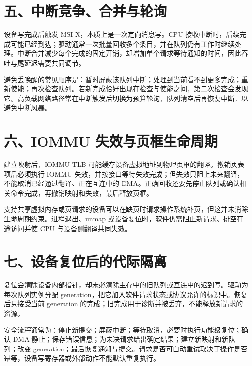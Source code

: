 \section{五、中断竞争、合并与轮询}

设备写完成后触发 MSI-X，本质上是一次定向消息写。CPU 接收中断时，后续完成可能已经到达；驱动通常一次批量回收多个条目，并在队列仍有工作时继续处理。中断合并减少每个完成的固定开销，却增加单个请求等待通知的时间，因此吞吐与尾延迟需要共同调节。

避免丢唤醒的常见顺序是：暂时屏蔽该队列中断；处理到当前看不到更多完成；重新使能；再次检查队列。若新完成恰好出现在检查与使能之间，第二次检查会发现它。高负载网络路径常在中断触发后切换为预算轮询，队列清空后再恢复中断，以避免中断风暴。

\section{六、IOMMU 失效与页框生命周期}

建立映射后，IOMMU TLB 可能缓存设备虚拟地址到物理页框的翻译。撤销页表项后必须执行 IOMMU 失效，并按接口等待失效完成；但失效只阻止未来翻译，不能取消已经通过翻译、正在互连中的 DMA。正确回收还要先停止队列或确认相关命令完成，再撤销映射和失效，最后释放页框。

支持共享虚拟内存或页请求的设备可以在缺页时请求操作系统补页，但这并未消除生命周期约束。进程退出、unmap 或设备复位时，软件仍需阻止新请求、排空在途访问并使 CPU 与设备侧翻译共同失效。

\section{七、设备复位后的代际隔离}

复位会清除设备内部指针，却未必清除主存中的旧队列或互连中的迟到写。驱动为每次队列实例分配 generation，把它加入软件请求状态或协议允许的标识中。恢复后只接受当前 generation 的完成；旧完成用于诊断并被丢弃，不能释放新请求的资源。

安全流程通常为：停止新提交；屏蔽中断；等待取消，必要时执行功能级复位；确认 DMA 静止；保存错误信息；为未决请求给出确定结果；建立新映射和新队列；改变 generation；最后恢复通知与提交。请求是否可自动重试取决于操作是否幂等，设备写寄存器或外部动作不能默认重复执行。




























